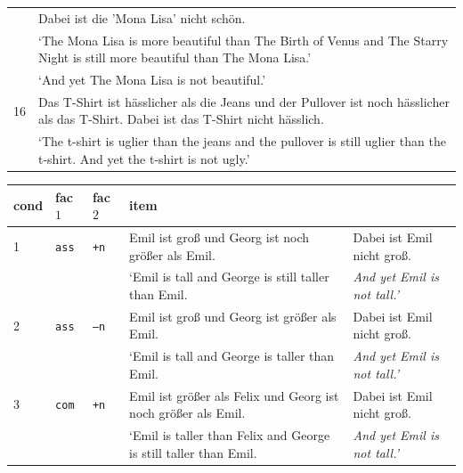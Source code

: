 \documentclass[output=paper,
modfonts
]{langscibook}
\begin{document}
\begin{longtable}{lp{317.90625pt}}
   & Dabei ist die 'Mona Lisa' nicht schön. \\
   & {`The Mona Lisa is more beautiful than The Birth of Venus and The Starry Night is still more beautiful than The Mona Lisa.'}\\
   & {`And yet The Mona Lisa is not beautiful.'}\\
\midrule
16 & Das T-Shirt ist hässlicher als die Jeans und der Pullover ist noch hässlicher als das T-Shirt. Dabei ist das T-Shirt nicht hässlich.\\
   & {`The t-shirt is uglier than the jeans and the pullover is still uglier than the t-shirt. And yet the t-shirt is not ugly.'}\\
\end{longtable}


\begin{table}
\begin{tabular}{lllll}
\lsptoprule
cond & fac $1$ & fac $2$ & item & \\
\midrule
1 & \texttt{ass} & \texttt{\footnotesize{+}n} & Emil ist groß \hspace{25pt} und Georg ist noch größer als Emil. & Dabei ist Emil nicht groß. \\
 & & & {`Emil is tall \hspace{32pt} and George is \hspace{0.4pt} still \hspace{2pt} taller than Emil.} & \textit{And yet Emil is not tall.'} \\
\midrule
2 & \texttt{ass} & \texttt{\footnotesize{--}n} & Emil ist groß \hspace{25pt} und Georg ist \hspace{16pt} größer als Emil. & Dabei ist Emil nicht groß. \\
 & & & {`Emil is tall \hspace{32pt} and George is \hspace{19pt} taller than Emil.} & \textit{And yet Emil is not tall.'}   \\
\midrule 
3 & \texttt{com} & \texttt{\footnotesize{+}n} & Emil ist größer als Felix \hspace{0.65pt} und Georg ist noch größer als Emil. & Dabei ist Emil nicht groß.   \\
 & & & {`Emil is taller than Felix \hspace{2pt} and George is \hspace{0.4pt} still \hspace{2pt} taller than Emil.} & \textit{And yet Emil is not tall.'}  \\

\end{tabular}
\end{table}
\end{document}
